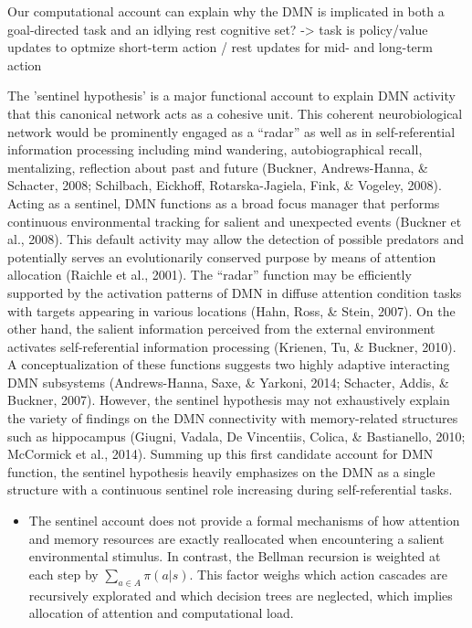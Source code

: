 \documentclass{article} %
\begin{document}
Our computational account can explain why the DMN is implicated in both a goal-directed task and an idlying rest cognitive set? -> task is policy/value updates to optmize short-term action / rest updates for mid- and long-term action


 The 'sentinel hypothesis' is a major functional account to explain DMN activity that this canonical network acts as a cohesive unit. This coherent neurobiological network would be prominently engaged as a “radar” as well as in self-referential information processing including mind wandering, autobiographical recall, mentalizing, reflection about past and future (Buckner, Andrews-Hanna, \& Schacter, 2008; Schilbach, Eickhoff, Rotarska-Jagiela, Fink, \& Vogeley, 2008). Acting as a sentinel, DMN functions as a broad focus manager that performs continuous environmental tracking for salient and unexpected events (Buckner et al., 2008). This default activity may allow the detection of possible predators and potentially serves an evolutionarily conserved purpose by means of attention allocation (Raichle et al., 2001). The “radar” function may be efficiently supported by the activation patterns of DMN in diffuse attention condition tasks with targets appearing in various locations (Hahn, Ross, \& Stein, 2007). On the other hand, the salient information perceived from the external environment activates self-referential information processing (Krienen, Tu, \& Buckner, 2010). A conceptualization of these functions suggests two highly adaptive interacting DMN subsystems (Andrews-Hanna, Saxe, \& Yarkoni, 2014; Schacter, Addis, \& Buckner, 2007). However, the sentinel hypothesis may not exhaustively explain the variety of findings on the DMN connectivity with memory-related structures such as hippocampus (Giugni, Vadala, De Vincentiis, Colica, \& Bastianello, 2010; McCormick et al., 2014). Summing up this first candidate account for DMN function, the sentinel hypothesis heavily emphasizes on the DMN as a single structure with a continuous sentinel role increasing during self-referential tasks.


 \begin{itemize}
   \item The sentinel account does not provide a formal mechanisms of
   how attention and memory resources are exactly reallocated when
    encountering a salient environmental stimulus. In contrast,
    the Bellman recursion is weighted at each step by
    $\sum_{a \in A}\pi(a|s)$. This factor weighs which action cascades
    are recursively explorated and which decision trees are neglected,
    which implies allocation of attention and computational load.
 \end{itemize}
\end{document}
